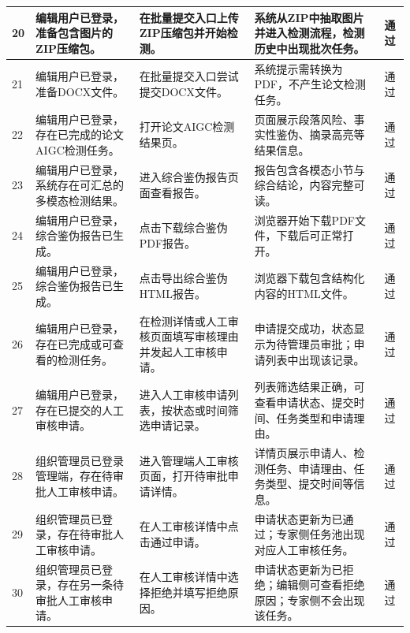 \documentclass[UTF8,a4paper,12pt]{ctexart}
\newcommand{\pass}{通过}
\begin{document}
\begin{longtable}{|P{0.9cm}|P{3.5cm}|P{4.7cm}|P{5.0cm}|P{1.2cm}|}
20 & 编辑用户已登录，准备包含图片的ZIP压缩包。 & 在批量提交入口上传ZIP压缩包并开始检测。 & 系统从ZIP中抽取图片并进入检测流程，检测历史中出现批次任务。 & \pass \\
\hline

21 & 编辑用户已登录，准备DOCX文件。 & 在批量提交入口尝试提交DOCX文件。 & 系统提示需转换为PDF，不产生论文检测任务。 & \pass \\
\hline

22 & 编辑用户已登录，存在已完成的论文AIGC检测任务。 & 打开论文AIGC检测结果页。 & 页面展示段落风险、事实性鉴伪、摘录高亮等结果信息。 & \pass \\
\hline

23 & 编辑用户已登录，系统存在可汇总的多模态检测结果。 & 进入综合鉴伪报告页面查看报告。 & 报告包含各模态小节与综合结论，内容完整可读。 & \pass \\
\hline

24 & 编辑用户已登录，综合鉴伪报告已生成。 & 点击下载综合鉴伪PDF报告。 & 浏览器开始下载PDF文件，下载后可正常打开。 & \pass \\
\hline

25 & 编辑用户已登录，综合鉴伪报告已生成。 & 点击导出综合鉴伪HTML报告。 & 浏览器下载包含结构化内容的HTML文件。 & \pass \\
\hline

26 & 编辑用户已登录，存在已完成或可查看的检测任务。 & 在检测详情或人工审核页面填写审核理由并发起人工审核申请。 & 申请提交成功，状态显示为待管理员审批；申请列表中出现该记录。 & \pass \\
\hline

27 & 编辑用户已登录，存在已提交的人工审核申请。 & 进入人工审核申请列表，按状态或时间筛选申请记录。 & 列表筛选结果正确，可查看申请状态、提交时间、任务类型和申请理由。 & \pass \\
\hline

28 & 组织管理员已登录管理端，存在待审批人工审核申请。 & 进入管理端人工审核页面，打开待审批申请详情。 & 详情页展示申请人、检测任务、申请理由、任务类型、提交时间等信息。 & \pass \\
\hline

29 & 组织管理员已登录，存在待审批人工审核申请。 & 在人工审核详情中点击通过申请。 & 申请状态更新为已通过；专家侧任务池出现对应人工审核任务。 & \pass \\
\hline

30 & 组织管理员已登录，存在另一条待审批人工审核申请。 & 在人工审核详情中选择拒绝并填写拒绝原因。 & 申请状态更新为已拒绝；编辑侧可查看拒绝原因；专家侧不会出现该任务。 & \pass \\
\hline


\end{longtable}
\end{document}

